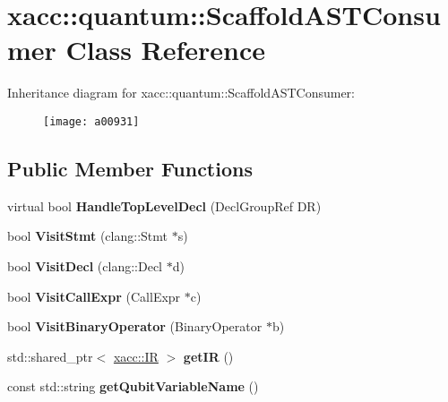 \hypertarget{a00931}{}\section{xacc\+:\+:quantum\+:\+:Scaffold\+A\+S\+T\+Consumer Class Reference}
\label{a00931}
Inheritance diagram for xacc\+:\+:quantum\+:\+:Scaffold\+A\+S\+T\+Consumer\+:\begin{figure}[H]
\begin{center}
\leavevmode
\texttt{[image: a00931]}
\end{center}
\end{figure}
\subsection*{Public Member Functions}
\begin{DoxyCompactItemize}
\item 
\mbox{\label{a00931_ae846fd40684f3a1f820b8711e1204089}} 
virtual bool {\bfseries Handle\+Top\+Level\+Decl} (Decl\+Group\+Ref DR)
\item 
\mbox{\label{a00931_a6693c27f68332d8142fbdcb405e3259b}} 
bool {\bfseries Visit\+Stmt} (clang\+::\+Stmt $\ast$s)
\item 
\mbox{\label{a00931_ae6a05fe567cd8ea15feb694dbb898c33}} 
bool {\bfseries Visit\+Decl} (clang\+::\+Decl $\ast$d)
\item 
\mbox{\label{a00931_a1478fc9e887b04d2ad2aa8347ef6bbcb}} 
bool {\bfseries Visit\+Call\+Expr} (Call\+Expr $\ast$c)
\item 
\mbox{\label{a00931_a3f2f070888678caf53e57041b4f5ddd6}} 
bool {\bfseries Visit\+Binary\+Operator} (Binary\+Operator $\ast$b)
\item 
\mbox{\label{a00931_af9dbfa7c52b8a7de99132257e154e29a}} 
std\+::shared\+\_\+ptr$<$ \hyperlink{a01151}{xacc\+::\+IR} $>$ {\bfseries get\+IR} ()
\item 
\mbox{\label{a00931_aa301f0bcae6fb5a1c17557ba08144cb4}} 
const std\+::string {\bfseries get\+Qubit\+Variable\+Name} ()
\end{DoxyCompactItemize}
